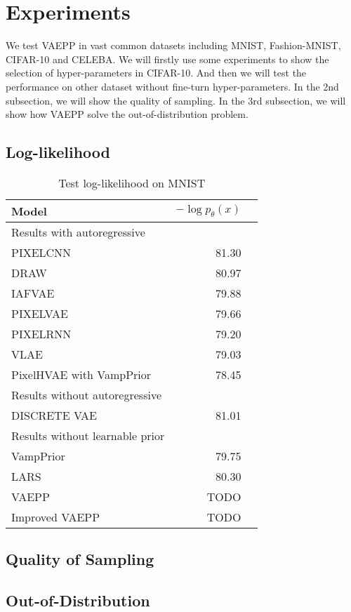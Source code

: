 \section{Experiments}
We test VAEPP in vast common datasets including MNIST, Fashion-MNIST, CIFAR-10 and CELEBA. 
We will firstly use some experiments to show the selection of hyper-parameters in CIFAR-10. And then we will test the performance on other dataset without fine-turn hyper-parameters. In the 2nd subsection, we will show the quality of sampling. In the 3rd subsection, we will show how VAEPP solve the out-of-distribution problem. 
\subsection{Log-likelihood}

\begin{table}
\centering
\begin{tabular}{lrr}  
\toprule
Model  &  $-\log p_\theta(x)$ \\
\midrule
Results with autoregressive   \\
PIXELCNN         &  81.30      \\
DRAW             &  80.97      \\
IAFVAE           &  79.88      \\
PIXELVAE         &  79.66      \\
PIXELRNN         &  79.20      \\
VLAE             &  79.03      \\
PixelHVAE with VampPrior        &  78.45      \\
\midrule
Results without autoregressive   \\
DISCRETE VAE     &  81.01      \\
\midrule
Results without learnable prior   \\
VampPrior        &  79.75      \\
LARS             &  80.30     \\
VAEPP            &  TODO      \\
Improved VAEPP   &  TODO      \\
\bottomrule
\end{tabular}
\caption{Test log-likelihood on MNIST}
\label{tab:mnist-nll}
\end{table}



\subsection{Quality of Sampling}


\subsection{Out-of-Distribution}


